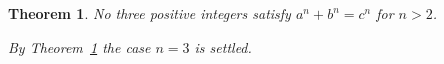 \documentclass{article}
\newtheorem{thm}{Theorem}
\begin{document}
\begin{thm}\label{thm:fermat}
\itshape No three positive integers satisfy $a^n+b^n=c^n$ for $n>2$.
\end{thm}
{\itshape By Theorem~\ref{thm:fermat} the case $n=3$ is settled.}
\end{document}
